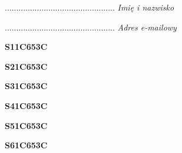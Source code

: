 \begin{turn}{90}\begin{minipage}{\linewidth} \vspace{20mm} ................................................  \textit{Imię i nazwisko}\end{minipage}\end{turn}

\begin{turn}{90}\begin{minipage}{\linewidth} \vspace{20mm} ................................................  \textit{Adres e-mailowy}\end{minipage}\end{turn}

\begin{turn}{90}\huge \begin{minipage}{\linewidth} \vspace{10mm}\textbf{S11C653C}\end{minipage}\end{turn}

\begin{turn}{90}\huge \begin{minipage}{\linewidth} \vspace{10mm}\textbf{S21C653C}\end{minipage}\end{turn}

\begin{turn}{90}\huge \begin{minipage}{\linewidth} \vspace{10mm}\textbf{S31C653C}\end{minipage}\end{turn}

\begin{turn}{90}\huge \begin{minipage}{\linewidth} \vspace{10mm}\textbf{S41C653C}\end{minipage}\end{turn}

\begin{turn}{90}\huge \begin{minipage}{\linewidth} \vspace{10mm}\textbf{S51C653C}\end{minipage}\end{turn}

\begin{turn}{90}\huge \begin{minipage}{\linewidth} \vspace{10mm}\textbf{S61C653C}\end{minipage}\end{turn}

